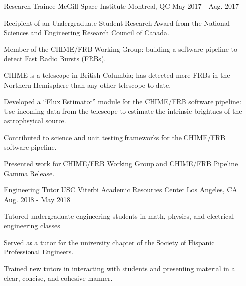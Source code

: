 \begin{cventries}
  \cventry
    {Research Trainee} %
    {McGill Space Institute} %
    {Montreal, QC} %
    {May 2017 - Aug. 2017} %
    {
      \begin{cvitems} %
        \item {Recipient of an Undergraduate Student Research Award from the National Sciences and Engineering Research Council of Canada.}
        \item {Member of the CHIME/FRB Working Group: building a software pipeline to detect Fast Radio Bursts (FRBs).}
        \item {CHIME is a telescope in British Columbia; has detected more FRBs in the Northern Hemisphere than any other telescope to date.}
        \item {Developed a ``Flux Estimator'' module for the CHIME/FRB software pipeline: Use incoming data from the telescope to estimate the intrinsic brightnes of the astrophsyical source.}
        \item {Contributed to science and unit testing frameworks for the CHIME/FRB software pipeline.}
        \item {Presented work for CHIME/FRB Working Group and CHIME/FRB Pipeline Gamma Release.}
      \end{cvitems}
    }

    \cventry
    {Engineering Tutor} %
    {USC Viterbi Academic Resources Center} %
    {Los Angeles, CA} %
    {Aug. 2018 - May 2018} %
    {
      \begin{cvitems} %
        \item {Tutored undergraduate engineering students in math, physics, and electrical engineering classes.}
        \item {Served as a tutor for the university chapter of the Society of Hispanic Professional Engineers.}
        \item {Trained new tutors in interacting with students and presenting material in a clear, concise, and cohesive manner.}
      \end{cvitems}
    }


\end{cventries}
